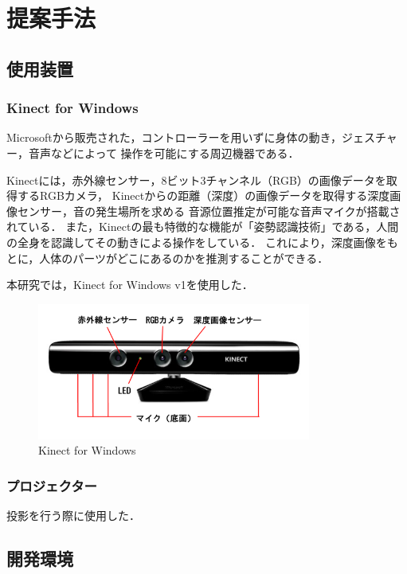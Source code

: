 \chapter{提案手法}
\thispagestyle{fancy}

\section{使用装置}
\subsection{Kinect for Windows}
Microsoftから販売された，コントローラーを用いずに身体の動き，ジェスチャー，音声などによって
操作を可能にする周辺機器である．

Kinectには，赤外線センサー，8ビット3チャンネル（RGB）の画像データを取得するRGBカメラ，
Kinectからの距離（深度）の画像データを取得する深度画像センサー，音の発生場所を求める
音源位置推定が可能な音声マイクが搭載されている．
また，Kinectの最も特徴的な機能が「姿勢認識技術」である，人間の全身を認識してその動きによる操作をしている．
これにより，深度画像をもとに，人体のパーツがどこにあるのかを推測することができる\cite{kinect}．

本研究では，Kinect for Windows v1を使用した．

\begin{figure}[b]
    \centering
    \includegraphics[width=9cm]{image/kinect.png}
    \caption{Kinect for Windows\cite{kinect}}
  \label{kinect}
\end{figure}

\clearpage

\subsection{プロジェクター}
投影を行う際に使用した．


\section{開発環境}

